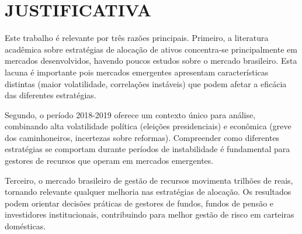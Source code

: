 \section{JUSTIFICATIVA}

Este trabalho é relevante por três razões principais. Primeiro, a literatura acadêmica sobre estratégias de alocação de ativos concentra-se principalmente em mercados desenvolvidos, havendo poucos estudos sobre o mercado brasileiro. Esta lacuna é importante pois mercados emergentes apresentam características distintas (maior volatilidade, correlações instáveis) que podem afetar a eficácia das diferentes estratégias.

Segundo, o período 2018-2019 oferece um contexto único para análise, combinando alta volatilidade política (eleições presidenciais) e econômica (greve dos caminhoneiros, incertezas sobre reformas). Compreender como diferentes estratégias se comportam durante períodos de instabilidade é fundamental para gestores de recursos que operam em mercados emergentes.

Terceiro, o mercado brasileiro de gestão de recursos movimenta trilhões de reais, tornando relevante qualquer melhoria nas estratégias de alocação. Os resultados podem orientar decisões práticas de gestores de fundos, fundos de pensão e investidores institucionais, contribuindo para melhor gestão de risco em carteiras domésticas.